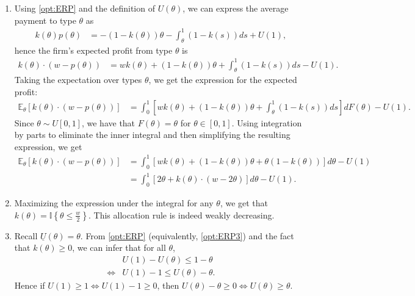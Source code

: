 \documentclass[a4paper]{article}
\begin{document}
\begin{enumerate}
		\item Using \eqref{opt:ERP} and the definition of $U(\theta)$, we can express the average payment to type $\theta$ as
		\begin{align}
			\label{opt:ERP1}
			k(\theta)p(\theta) &= -(1-k(\theta)) \theta - \int_{\theta}^{1} (1-k(s)) ds + U(1),
		\end{align}
		hence the firm's expected profit from type $\theta$ is
		\begin{align*}
			k(\theta)\cdot (w-p(\theta)) &= wk(\theta) + (1-k(\theta)) \theta + \int_{\theta}^{1} (1-k(s)) ds - U(1).
		\end{align*}
		Taking the expectation over types $\theta$, we get the expression for the expected profit:
		\begin{align*}
			\mathbb{E}_\theta [k(\theta)\cdot (w-p(\theta))] &= \int_0^1 \left[ wk(\theta) + (1-k(\theta)) \theta + \int_{\theta}^{1} (1-k(s)) ds \right] dF(\theta) - U(1).
		\end{align*}
		Since $\theta \sim U[0,1]$, we have that $F(\theta) = \theta$ for $\theta \in [0,1]$. Using integration by parts to eliminate the inner integral and then simplifying the resulting expression, we get
		\begin{align*}
			\mathbb{E}_\theta [k(\theta)\cdot (w-p(\theta))] &= \int_0^1 \left[ wk(\theta) + (1-k(\theta)) \theta + \theta (1-k(\theta)) \right] d\theta - U(1)
			\\
			&= \int_0^1 \left[ 2\theta + k(\theta) \cdot (w - 2\theta ) \right] d\theta - U(1).
		\end{align*}
		
		\item Maximizing the expression under the integral for any $\theta$, we get that $k(\theta) = \mathbb{I}\left\{ \theta \leq \frac{w}{2} \right\}$. This allocation rule is indeed weakly decreasing.
		
		\item Recall $\underline{U}(\theta)=\theta$. From \eqref{opt:ERP} (equivalently, \eqref{opt:ERP3}) and the fact that $k(\theta) \geq 0$, we can infer that for all $\theta$,
		\begin{align*}
			&U(1) - U(\theta) \leq 1-\theta
			\\
			\Leftrightarrow &U(1) - 1 \leq U(\theta) - \theta.
		\end{align*}
		Hence if $U(1)\geq 1 \iff U(1)-1 \geq 0$, then $U(\theta)-\theta \geq 0 \iff U(\theta) \geq \theta$.
		

\end{enumerate}
\end{document}
